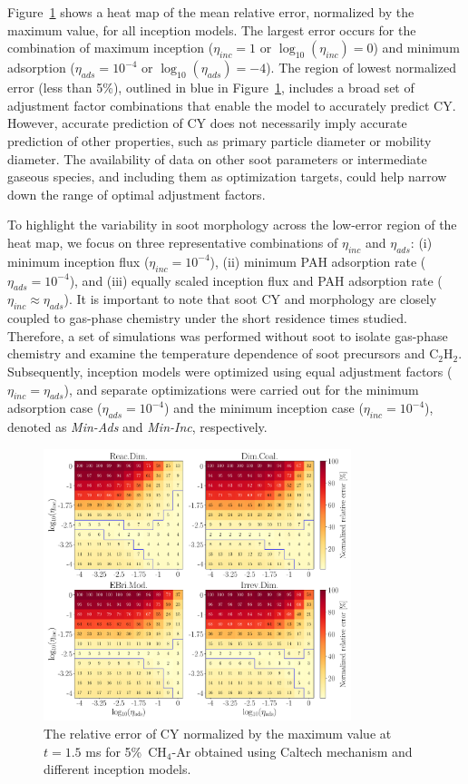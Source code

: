 Figure~\ref{fig:shockagof_yielderror_cpr} shows a heat map of the mean relative error, normalized by the maximum value, for all inception models. The largest error occurs for the combination of maximum inception ($\eta_{inc} = 1$ or $\log_{10}(\eta_{inc}) = 0$) and minimum adsorption ($\eta_{ads} = 10^{-4}$ or $\log_{10}(\eta_{ads}) = -4$). The region of lowest normalized error (less than 5\%), outlined in blue in Figure~\ref{fig:shockagof_yielderror_cpr}, includes a broad set of adjustment factor combinations that enable the model to accurately predict CY. However, accurate prediction of CY does not necessarily imply accurate prediction of other properties, such as primary particle diameter or mobility diameter. The availability of data on other soot parameters or intermediate gaseous species, and including them as optimization targets, could help narrow down the range of optimal adjustment factors.

To highlight the variability in soot morphology across the low-error region of the heat map, we focus on three representative combinations of $\eta_{inc}$ and $\eta_{ads}$: (i) minimum inception flux ($\eta_{inc} = 10^{-4}$), (ii) minimum PAH adsorption rate ($\eta_{ads} = 10^{-4}$), and (iii) equally scaled inception flux and PAH adsorption rate ($\eta_{inc} \approx \eta_{ads}$). It is important to note that soot CY and morphology are closely coupled to gas-phase chemistry under the short residence times studied. Therefore, a set of simulations was performed without soot to isolate gas-phase chemistry and examine the temperature dependence of soot precursors and $\mathrm{C_2H_2}$. Subsequently, inception models were optimized using equal adjustment factors ($\eta_{inc} = \eta_{ads}$), and separate optimizations were carried out for the minimum adsorption case ($\eta_{ads} = 10^{-4}$) and the minimum inception case ($\eta_{inc} = 10^{-4}$), denoted as \textit{Min-Ads} and \textit{Min-Inc}, respectively.


\begin{figure}[H]
	\centering
	\includegraphics[width=0.8\textwidth]{Figures/Results/Shocktube/Agafonov2016_cpr/5CH4_norm_yield_error_all.pdf}
	\caption{The relative error of CY normalized by the maximum value at $t=1.5$ ms for 5\%~$\mathrm{CH_4}$-Ar obtained using Caltech mechanism and different inception models.}
	\label{fig:shockagof_yielderror_cpr} 
\end{figure}


